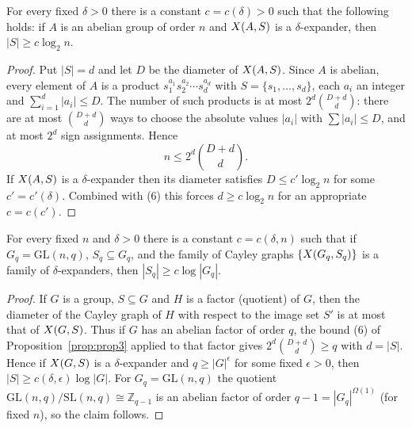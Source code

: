\begin{proposition}
  \label{prop:prop3}
  For every fixed $\delta > 0$ there is a constant $c = c(\delta) > 0$ such that
  the following holds: if $A$ is an abelian group of order $n$ and $X(A,S)$ is
  a $\delta$-expander, then $|S| \ge c\log_2 n$.
\end{proposition}
\begin{proof}
  Put $|S| = d$ and let $D$ be the diameter of $X(A,S)$. Since $A$ is abelian,
  every element of $A$ is a product $s_1^{a_1} s_2^{a_2}\cdots s_d^{a_d}$ with
  $S = \{s_1,\dots,s_d\}$, each $a_i$ an integer and $\sum_{i=1}^{d}|a_i| \le D$.
  The number of such products is at most $2^{d}\binom{D+d}{d}$: there are at most
  $\binom{D+d}{d}$ ways to choose the absolute values $|a_i|$ with
  $\sum |a_i| \le D$, and at most $2^{d}$ sign assignments. Hence
  \[
    n \le 2^{d}\binom{D + d}{d}. \tag{6}
  \]
  If $X(A,S)$ is a $\delta$-expander then its diameter satisfies
  $D \le c'\log_2 n$ for some $c' = c'(\delta)$. Combined with (6) this forces
  $d \ge c\log_2 n$ for an appropriate $c = c(c')$.
\end{proof}

\begin{proposition}
  \label{prop:gl-expander}
  For every fixed $n$ and $\delta > 0$ there is a constant $c = c(\delta, n)$
  such that if $G_q = \mathrm{GL}(n,q)$, $S_q \subseteq G_q$, and the family of
  Cayley graphs $\{X(G_q, S_q)\}$ is a family of $\delta$-expanders, then
  $|S_q| \ge c\log|G_q|$.
\end{proposition}
\begin{proof}
  If $G$ is a group, $S \subseteq G$ and $H$ is a factor (quotient) of $G$, then
  the diameter of the Cayley graph of $H$ with respect to the image set $S'$ is
  at most that of $X(G,S)$. Thus if $G$ has an abelian factor of order $q$,
  the bound (6) of Proposition~\ref{prop:prop3} applied to that factor gives
  $2^{d}\binom{D+d}{d} \ge q$ with $d = |S|$. Hence if $X(G,S)$ is a
  $\delta$-expander and $q \ge |G|^{\epsilon}$ for some fixed $\epsilon > 0$,
  then $|S| \ge c(\delta,\epsilon)\log|G|$. For $G_q = \mathrm{GL}(n,q)$ the
  quotient $\mathrm{GL}(n,q)/\mathrm{SL}(n,q) \cong \mathbb{Z}_{q-1}$ is an
  abelian factor of order $q - 1 = |G_q|^{\Omega(1)}$ (for fixed $n$), so the
  claim follows.
\end{proof}

